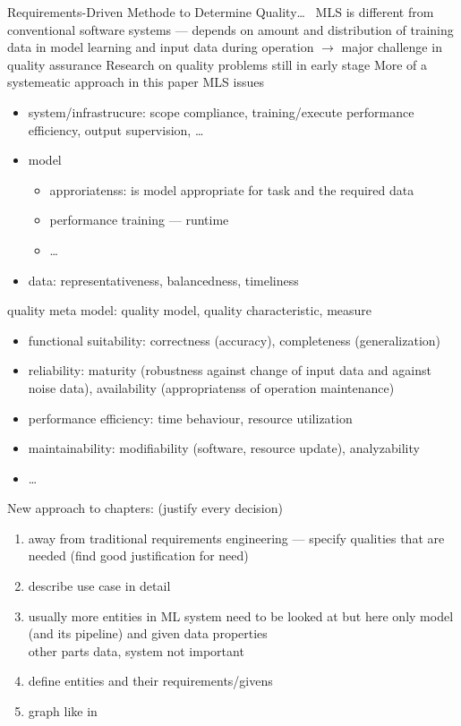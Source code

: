 Requirements-Driven Methode to Determine Quality\ldots~\cite{nakamichi_requirements-driven_2020}
MLS is different from conventional software systems --- depends on amount and distribution of
training data in model learning and input data during operation $\rightarrow$ major challenge in
quality assurance
Research on quality problems still in early stage
More of a systemeatic approach in this paper
MLS issues
\begin{itemize}
    \item system/infrastrucure: scope compliance, training/execute performance efficiency, output
        supervision, \ldots
    \item model
        \begin{itemize}
            \item approriatenss: is model appropriate for task and the required data
            \item performance training --- runtime
            \item \ldots
        \end{itemize}
    \item data: representativeness, balancedness, timeliness
\end{itemize}
quality meta model: quality model, quality characteristic, measure
\begin{itemize}
    \item functional suitability: correctness (accuracy), completeness (generalization)
    \item reliability: maturity (robustness against change of input data and against noise data),
        availability (appropriatenss of operation maintenance)
    \item performance efficiency: time behaviour, resource utilization
    \item maintainability: modifiability (software, resource update), analyzability
    \item \ldots
\end{itemize}


New approach to chapters: (justify every decision)
\begin{enumerate}
    \item away from traditional requirements engineering --- specify qualities that are needed
        (find good justification for need)
    \item describe use case in detail
    \item usually more entities in ML system need to be looked at but here only model (and its pipeline)
        and given data properties\\
        other parts data, system not important
    \item define entities and their requirements/givens
    \item graph like in~\cite{siebert_construction_2021}
\end{enumerate}

